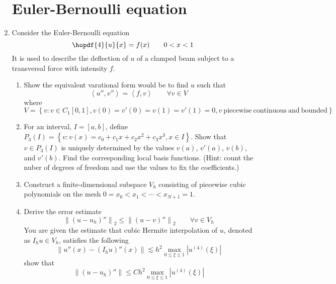 \documentclass{article}
\newcommand\NoIndent[1]{%
  \begingroup
  \par
  \parshape0
  #1\par
  \endgroup
}
\begin{document}
\begin{enumerate}
\NoIndent{\section{Euler-Bernoulli equation}}

	\item Consider the Euler-Bernoulli equation
		\begin{equation*}
			\hopdf{4}{u}{x} = f(x) \qquad 0 < x < 1
		\end{equation*}
		It is used to describe the deflection of $u$ of a clamped beam
		subject to a transversal force with intensity $f$.
		\begin{enumerate}
			\item Show the equivalent varational form would be to find $u$ such that
				\begin{equation*}
					\left<u'',v''\right> = \left<f,v\right> \qquad \forall v \in V
				\end{equation*}
				where $V = \left\{v:v\in C_1[0,1],v(0)=v'(0)=v(1)=v'(1)=0,
					v\mathrm{\ piecewise\ continuous\ and\ bounded}\right\}$
			\item For an interval, $I = [a,b]$, define $P_3(I) =
				\left\{v:v(x) = c_0 + c_1 x + c_2 x^2 + c_3 x^3, x \in I\right\}$.
				Show that $v \in P_3(I)$ is uniquely determined by the values
				$v(a)$, $v'(a)$, $v(b)$, and $v'(b)$.
				Find the corresponding local basis functions.
				(Hint: count the nuber of degrees of freedom and use the values to fix the coefficients.)
			\item Construct a finite-dimensional subspace $V_h$ consisting of
				piecewise cubic polynomials on the mesh $0 = x_0 < x_1 < \cdots < x_{N+1} = 1$.
			\item Derive the error estimate
				\begin{equation*}
					\left\|\left(u - u_h\right)''\right\|_2 \leq \left\|\left(u - v\right)''\right\|_2
						\qquad \forall v \in V_h
				\end{equation*}
				You are given the estimate that cubic Hermite interpolation of $u$,
				denoted as $I_h u \in V_h$, satisfies the following
				\begin{equation*}
					\left\|u''(x) - \left(I_h u\right)''(x)\right\| \lesssim
						h^2\max_{0\leq\xi\leq 1}\left|u^{(4)}(\xi)\right|
				\end{equation*}
				show that
				\begin{equation*}
					\left\|\left(u - u_h\right)''\right\| \leq
						Ch^2\max_{0\leq\xi\leq 1}\left|u^{(4)}(\xi)\right|
				\end{equation*}

\end{enumerate}
\end{enumerate}
\end{document}
